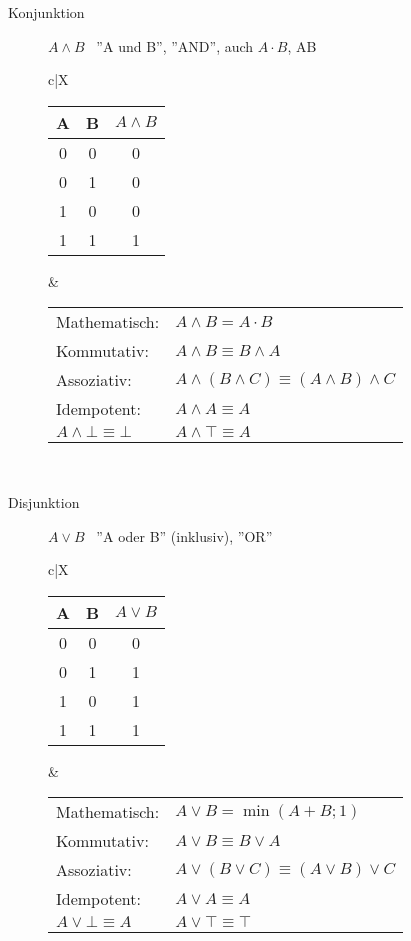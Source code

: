 \documentclass[12pt,a4paper]{article}
\begin{document}
\begin{description}
\begin{description}
			\item[Konjunktion] $A\wedge B$ \, ''A und B'', ''AND'', auch $A\cdot B$, AB \\
				\begin{tabularx}{\linewidth}{c|X}
					\begin{tabular}[t]{c|c||c}
						A & B & $A \wedge B$ \\ \hline\hline
						0 & 0 & 0 \\ \hline
						0 & 1 & 0 \\ \hline
						1 & 0 & 0 \\ \hline
						1 & 1 & 1
					\end{tabular} &
					\begin{tabular}[t]{ll}
						Mathematisch: & $A \wedge B = A \cdot B$ \\
						Kommutativ: & $A \wedge B \equiv B \wedge A$ \\
						Assoziativ: & $A \wedge (B \wedge C) \equiv (A \wedge B) \wedge C$ \\
						Idempotent: & $A \wedge A \equiv A$ \\
						$A \wedge \bot \equiv \bot$ & $A \wedge \top \equiv A$
					\end{tabular} \\ \hline
				\end{tabularx}	
			
			\item[Disjunktion] $A\vee B$ \, ''A oder B'' (inklusiv), ''OR'' \\
				\begin{tabularx}{\linewidth}{c|X}
					\begin{tabular}[t]{c|c||c}
						A & B & $A \vee B$ \\ \hline\hline
						0 & 0 & 0 \\ \hline
						0 & 1 & 1 \\ \hline
						1 & 0 & 1 \\ \hline
					1 & 1 & 1
					\end{tabular} &
					\begin{tabular}[t]{ll}
						Mathematisch: & $A \vee B = \min(A+B;1)$ \\
						Kommutativ: & $A \vee B \equiv B \vee A$ \\
						Assoziativ: & $A \vee (B \vee C) \equiv (A \vee B) \vee C$ \\
						Idempotent: & $A \vee A \equiv A$ \\
						$A \vee \bot \equiv A $ & $A \vee \top \equiv \top$
					\end{tabular} \\ \hline
				\end{tabularx}
				

\end{description}
\end{description}
\end{document}
